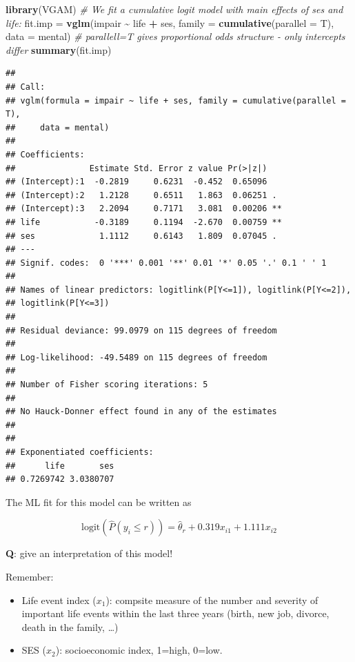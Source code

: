 \documentclass[
  ignorenonframetext,
]{beamer}
\newenvironment{Shaded}{\begin{snugshade}}{\end{snugshade}}
\newcommand{\AttributeTok}[1]{\textcolor[rgb]{0.13,0.29,0.53}{#1}}
\newcommand{\CommentTok}[1]{\textcolor[rgb]{0.56,0.35,0.01}{\textit{#1}}}
\newcommand{\FunctionTok}[1]{\textcolor[rgb]{0.13,0.29,0.53}{\textbf{#1}}}
\newcommand{\NormalTok}[1]{#1}
\newcommand{\OtherTok}[1]{\textcolor[rgb]{0.56,0.35,0.01}{#1}}
\newcommand{\SpecialCharTok}[1]{\textcolor[rgb]{0.81,0.36,0.00}{\textbf{#1}}}
\providecommand{\tightlist}{%
  \setlength{\itemsep}{0pt}\setlength{\parskip}{0pt}}
\begin{document}
\begin{frame}[fragile]
\begin{Shaded}
\begin{Highlighting}[]
\FunctionTok{library}\NormalTok{(VGAM)}
\CommentTok{\# We fit a cumulative logit model with main effects of \textquotesingle{}ses\textquotesingle{} and \textquotesingle{}life\textquotesingle{}:}
\NormalTok{fit.imp }\OtherTok{=} \FunctionTok{vglm}\NormalTok{(impair }\SpecialCharTok{\textasciitilde{}}\NormalTok{ life }\SpecialCharTok{+}\NormalTok{ ses, }\AttributeTok{family =} \FunctionTok{cumulative}\NormalTok{(}\AttributeTok{parallel =}\NormalTok{ T), }\AttributeTok{data =}\NormalTok{ mental)}
\CommentTok{\# parallell=T gives proportional odds structure {-} only intercepts differ}
\FunctionTok{summary}\NormalTok{(fit.imp)}
\end{Highlighting}
\end{Shaded}

\begin{verbatim}
## 
## Call:
## vglm(formula = impair ~ life + ses, family = cumulative(parallel = T), 
##     data = mental)
## 
## Coefficients: 
##               Estimate Std. Error z value Pr(>|z|)   
## (Intercept):1  -0.2819     0.6231  -0.452  0.65096   
## (Intercept):2   1.2128     0.6511   1.863  0.06251 . 
## (Intercept):3   2.2094     0.7171   3.081  0.00206 **
## life           -0.3189     0.1194  -2.670  0.00759 **
## ses             1.1112     0.6143   1.809  0.07045 . 
## ---
## Signif. codes:  0 '***' 0.001 '**' 0.01 '*' 0.05 '.' 0.1 ' ' 1
## 
## Names of linear predictors: logitlink(P[Y<=1]), logitlink(P[Y<=2]), 
## logitlink(P[Y<=3])
## 
## Residual deviance: 99.0979 on 115 degrees of freedom
## 
## Log-likelihood: -49.5489 on 115 degrees of freedom
## 
## Number of Fisher scoring iterations: 5 
## 
## No Hauck-Donner effect found in any of the estimates
## 
## 
## Exponentiated coefficients:
##      life       ses 
## 0.7269742 3.0380707
\end{verbatim}
\end{frame}

\begin{frame}
The ML fit for this model can be written as

\[ \text{logit}(\hat{P}(y_i\le r))=\hat{\theta}_r+0.319 x_{i1}+1.111 x_{i2}\]

\textbf{Q}: give an interpretation of this model!

Remember:

\begin{itemize}
\tightlist
\item
  Life event index (\(x_1\)): compsite measure of the number and
  severity of important life events within the last three years (birth,
  new job, divorce, death in the family, \ldots)
\item
  SES (\(x_2\)): socioeconomic index, 1=high, 0=low.
\end{itemize}
\end{frame}
\end{document}
